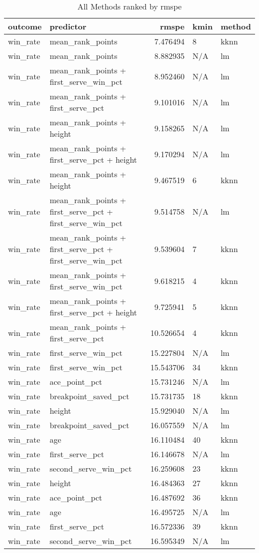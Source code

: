 \documentclass[
]{article}
\begin{document}
\begin{table}

\caption{\label{tab:minimum-rspe}All Methods ranked by rmspe}
\centering
\begin{tabular}[t]{l|l|r|l|l}
\hline
outcome & predictor & rmspe & kmin & method\\
\hline
win\_rate & mean\_rank\_points & 7.476494 & 8 & kknn\\
\hline
win\_rate & mean\_rank\_points & 8.882935 & N/A & lm\\
\hline
win\_rate & mean\_rank\_points + first\_serve\_win\_pct & 8.952460 & N/A & lm\\
\hline
win\_rate & mean\_rank\_points + first\_serve\_pct & 9.101016 & N/A & lm\\
\hline
win\_rate & mean\_rank\_points + height & 9.158265 & N/A & lm\\
\hline
win\_rate & mean\_rank\_points + first\_serve\_pct + height & 9.170294 & N/A & lm\\
\hline
win\_rate & mean\_rank\_points + height & 9.467519 & 6 & kknn\\
\hline
win\_rate & mean\_rank\_points + first\_serve\_pct + first\_serve\_win\_pct & 9.514758 & N/A & lm\\
\hline
win\_rate & mean\_rank\_points + first\_serve\_pct + first\_serve\_win\_pct & 9.539604 & 7 & kknn\\
\hline
win\_rate & mean\_rank\_points + first\_serve\_win\_pct & 9.618215 & 4 & kknn\\
\hline
win\_rate & mean\_rank\_points + first\_serve\_pct + height & 9.725941 & 5 & kknn\\
\hline
win\_rate & mean\_rank\_points + first\_serve\_pct & 10.526654 & 4 & kknn\\
\hline
win\_rate & first\_serve\_win\_pct & 15.227804 & N/A & lm\\
\hline
win\_rate & first\_serve\_win\_pct & 15.543706 & 34 & kknn\\
\hline
win\_rate & ace\_point\_pct & 15.731246 & N/A & lm\\
\hline
win\_rate & breakpoint\_saved\_pct & 15.731735 & 18 & kknn\\
\hline
win\_rate & height & 15.929040 & N/A & lm\\
\hline
win\_rate & breakpoint\_saved\_pct & 16.057559 & N/A & lm\\
\hline
win\_rate & age & 16.110484 & 40 & kknn\\
\hline
win\_rate & first\_serve\_pct & 16.146678 & N/A & lm\\
\hline
win\_rate & second\_serve\_win\_pct & 16.259608 & 23 & kknn\\
\hline
win\_rate & height & 16.484363 & 27 & kknn\\
\hline
win\_rate & ace\_point\_pct & 16.487692 & 36 & kknn\\
\hline
win\_rate & age & 16.495725 & N/A & lm\\
\hline
win\_rate & first\_serve\_pct & 16.572336 & 39 & kknn\\
\hline
win\_rate & second\_serve\_win\_pct & 16.595349 & N/A & lm\\
\hline
\end{tabular}
\end{table}
\end{document}
